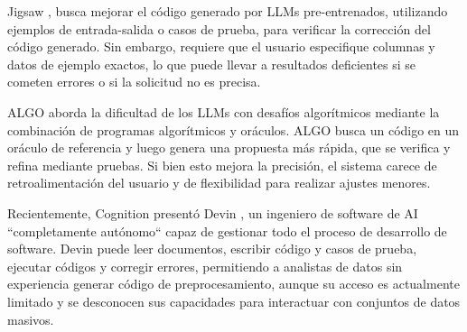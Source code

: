 Jigsaw \cite{jain2022jigsaw}, busca mejorar el código generado por LLMs pre-entrenados, utilizando ejemplos de entrada-salida o casos de prueba, para verificar la corrección del código generado. Sin embargo, requiere que el usuario especifique columnas y datos de ejemplo exactos, lo que puede llevar a resultados deficientes si se cometen errores o si la solicitud no es precisa.

ALGO \cite{zhang2023algo} aborda la dificultad de los LLMs con desafíos algorítmicos mediante la combinación de programas algorítmicos y oráculos. ALGO busca un código en un oráculo de referencia y luego genera una propuesta más rápida, que se verifica y refina mediante pruebas. Si bien esto mejora la precisión, el sistema carece de retroalimentación del usuario y de flexibilidad para realizar ajustes menores.

Recientemente, Cognition presentó Devin \cite{devin}, un ingeniero de software de AI ``completamente autónomo`` capaz de gestionar todo el proceso de desarrollo de software. Devin puede leer documentos, escribir código y casos de prueba, ejecutar códigos y corregir errores, permitiendo a analistas de datos sin experiencia generar código de preprocesamiento, aunque su acceso es actualmente limitado y se desconocen sus capacidades para interactuar con conjuntos de datos masivos.